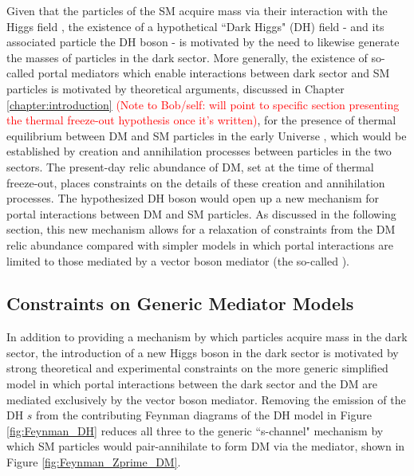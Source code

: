 Given that the particles of the SM acquire mass via their interaction with the Higgs field \cite{HiggsTheory1,HiggsTheory2,HiggsTheory3}, the existence of a hypothetical ``Dark Higgs" (DH) field - and its associated particle the DH boson - is motivated by the need to likewise generate the masses of particles in the dark sector. More generally, the existence of so-called portal mediators which enable interactions between dark sector and SM particles is motivated by theoretical arguments, discussed in Chapter \ref{chapter:introduction} \textcolor{red}{(Note to Bob/self: will point to specific section presenting the thermal freeze-out hypothesis once it's written)}, for the presence of thermal equilibrium between DM and SM particles in the early Universe \cite{DM_earlyUniverse}, which would be established by creation and annihilation processes between particles in the two sectors. The present-day relic abundance of DM, set at the time of thermal freeze-out, places constraints on the details of these creation and annihilation processes. The hypothesized DH boson would open up a new mechanism for portal interactions between DM and SM particles. As discussed in the following section, this new mechanism allows for a relaxation of constraints from the DM relic abundance compared with simpler models in which portal interactions are limited to those mediated by a vector boson mediator (the so-called \Zprime). 

\subsection{Constraints on Generic \Zprime Mediator Models} 
\label{sec:Zprime_model_constraints}

In addition to providing a mechanism by which particles acquire mass in the dark sector, the introduction of a new Higgs boson in the dark sector is motivated by strong theoretical and experimental constraints \cite{Zprime_portal_gen, Zprime_portal_monojet_dijet} on the more generic simplified model in which portal interactions between the dark sector and the DM are mediated exclusively by the \Zprime vector boson mediator. Removing the emission of the DH \(s\) from the contributing Feynman diagrams of the DH model in Figure \ref{fig:Feynman_DH} reduces all three to the generic ``s-channel" mechanism by which SM particles would pair-annihilate to form DM via the \Zprime mediator, shown in Figure \ref{fig:Feynman_Zprime_DM}. 

